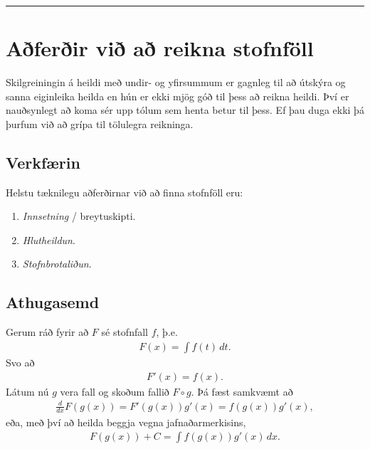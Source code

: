 \documentclass[b5paper,11pt,icelandic]{sphinxmanual}
\begin{document}
\bigskip\hrule{}\bigskip



\section{Aðferðir við að reikna stofnföll}
\label{kafli06:aferir-vi-a-reikna-stofnfoll}
Skilgreiningin á heildi með undir- og yfirsummum er gagnleg til að útskýra
og sanna eiginleika heilda en hún er ekki mjög góð til þess að reikna
heildi. Því er nauðsynlegt að koma sér upp tólum sem henta betur til þess.
Ef þau duga ekki þá þurfum við að grípa til tölulegra reikninga.


\subsection{Verkfærin}
\label{kafli06:verkfaerin}
Helstu tæknilegu aðferðirnar við að finna stofnföll eru:
\begin{enumerate}
\item {} 
\textit{Innsetning} / breytuskipti.

\item {} 
\textit{Hlutheildun}.

\item {} 
\textit{Stofnbrotaliðun}.

\end{enumerate}


\subsection{Athugasemd}
\label{kafli06:athugasemd}
Gerum ráð fyrir að \(F\) sé stofnfall \(f\), þ.e.
\begin{equation*}
\begin{split}F(x)=\int f(t)\,dt.\end{split}
\end{equation*}
Svo að
\begin{equation*}
\begin{split}F'(x)=f(x).\end{split}
\end{equation*}
Látum nú \(g\) vera fall og skoðum fallið \(F\circ g\). Þá fæst
samkvæmt {\hyperref[kafli03:kedjuregla]{}} að
\begin{equation*}
\begin{split}\frac{d}{dx}F(g(x))=F'(g(x))g'(x) = f(g(x))g'(x),\end{split}
\end{equation*}
eða, með því að heilda beggja vegna jafnaðarmerkisins,
\begin{equation*}
\begin{split}F(g(x))+C = \int f(g(x))g'(x)\,dx.\end{split}
\end{equation*}
\end{document}
